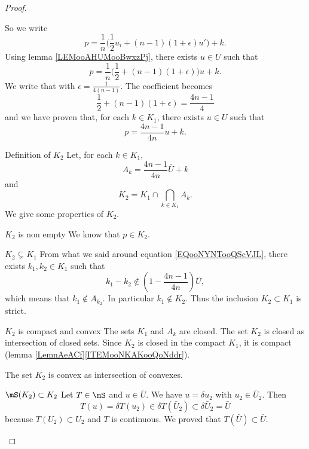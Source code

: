 \begin{proof}
\begin{subproof}
        So we write
        \begin{equation}
            p=\frac{1}{ n }\big( \frac{ 1 }{2}u_i +(n-1)(1+\epsilon)u' \big)+k.
        \end{equation}
        Using lemma \ref{LEMooAHUMooBwxzPj}, there exists \( u\in U\) such that
        \begin{equation}
            p=\frac{1}{ n }\big( \frac{ 1 }{2}+(n-1)(1+\epsilon) \big)u+k.
        \end{equation}
        We write that with \( \epsilon=\frac{1}{ 4(n-1) }\). The coefficient becomes
        \begin{equation}
            \frac{ 1 }{2}+(n-1)(1+\epsilon)=\frac{ 4n-1 }{ 4 }
        \end{equation}
        and we have proven that, for each \( k\in K_1\), there exists \( u\in U\) such that
        \begin{equation}
            p=\frac{ 4n-1 }{ 4n }u+k.
        \end{equation}
    \item[Definition of \( K_2\)]
        Let, for each \( k\in K_1\),
        \begin{equation}
            A_k=\frac{ 4n-1 }{ 4n }\bar U+k
        \end{equation}
        and
        \begin{equation}
            K_2=K_1\cap\bigcap_{k\in K_1}A_k.
        \end{equation}
        We give some properties of \( K_2\).
        \begin{subproof}
    \item[\( K_2\) is non empty]
        We know that \( p\in K_2\).
    \item[\( K_2\subsetneq K_1\)]
        From what we said around equation \eqref{EQooNYNTooQScVJL}, there exists \( k_1,k_2\in K_1\) such that
        \begin{equation}
            k_1-k_2\notin\left( 1-\frac{ 4n-1 }{ 4n } \right)\bar U,
        \end{equation}
        which means that \( k_1\notin A_{k_2}\). In particular \( k_1\notin K_2\). Thus the inclusion \( K_2\subset K_1\) is strict.
    \item[\( K_2\) is compact and convex]
        The sets \( K_1\) and \( A_k\) are closed. The set \( K_2\) is closed as intersection of closed sets. Since \( K_2\) is closed in the compact \( K_1\), it is compact (lemma \ref{LemnAeACf}\ref{ITEMooNKAKooQoNddr}).

        The set \( K_2\) is convex as intersection of convexes.
    \item[\( \mS(K_2)\subset K_2\)]
        Let \( T\in \mS\) and \( u\in\bar U\). We have \( u=\delta u_2\) with \( u_2\in\bar U_2\). Then
        \begin{equation}
            T(u)=\delta T(u_2)\in \delta T(\bar U_2)\subset \delta\bar U_2=\bar U
        \end{equation}
        because \( T(U_2)\subset U_2\) and \( T\) is continuous. We proved that \( T(\bar U)\subset \bar U\).


\end{subproof}
\end{subproof}
\end{proof}
